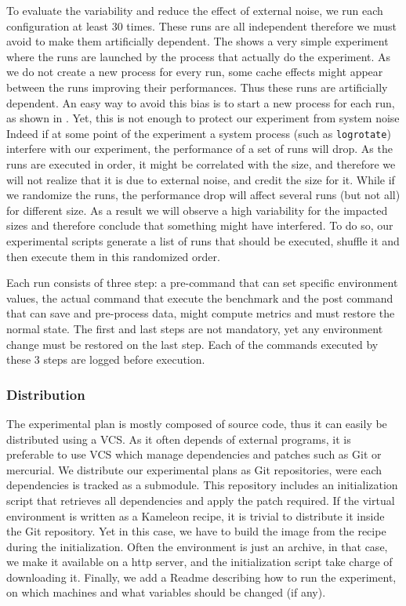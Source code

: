 To evaluate the variability and reduce the effect of external noise, we run each configuration at least $30$ times.
These runs are all independent therefore we must avoid to make them artificially dependent.
The  shows a very simple experiment where the runs are launched by the process that actually do the experiment.
As we do not create a new process for every run, some cache effects might appear between the runs improving their performances.
Thus these runs are artificially dependent.
An easy way to avoid this bias is to start a new process for each run, as shown in .
Yet, this is not enough to protect our experiment from system noise
Indeed if at some point of the experiment a system process (such as \texttt{logrotate}) interfere with our experiment, the performance of a set of runs will drop.
As the runs are executed in order, it might be correlated with the size, and therefore we will not realize that it is due to external noise, and credit the size for it.
While if we randomize the runs, the performance drop will affect several runs (but not all) for different size.
As a result we will observe a high variability for the impacted sizes and therefore conclude that something might have interfered.
To do so, our experimental scripts generate a list of runs that should be executed, shuffle it and then execute them in this randomized order.

Each run consists of three step: a pre-command that can set specific environment values, the actual command that execute the benchmark and the post command that can save and pre-process data, might compute metrics and must restore the normal state.
The first and last steps are not mandatory, yet any environment change must be restored on the last step.
Each of the commands executed by these 3 steps are logged before execution.

\subsubsection{Distribution}

The experimental plan is mostly composed of source code, thus it can easily be distributed using a \gls{VCS}.
As it often depends of external programs, it is preferable to use \gls{VCS} which manage dependencies and patches such as \gls{Git} or mercurial.
We distribute our experimental plans as \gls{Git} repositories, were each dependencies is tracked as a submodule.
This repository includes an initialization script that retrieves all dependencies and apply the patch required.
If the virtual environment is written as a \gls{Kameleon} recipe, it is trivial to distribute it inside the \gls{Git} repository.
Yet in this case, we have to build the image from the recipe during the initialization.
Often the environment is just an archive, in that case, we make it available on a http server, and the initialization script take charge of downloading it.
Finally, we add a Readme describing how to run the experiment, on which machines and what variables should be changed (if any).


